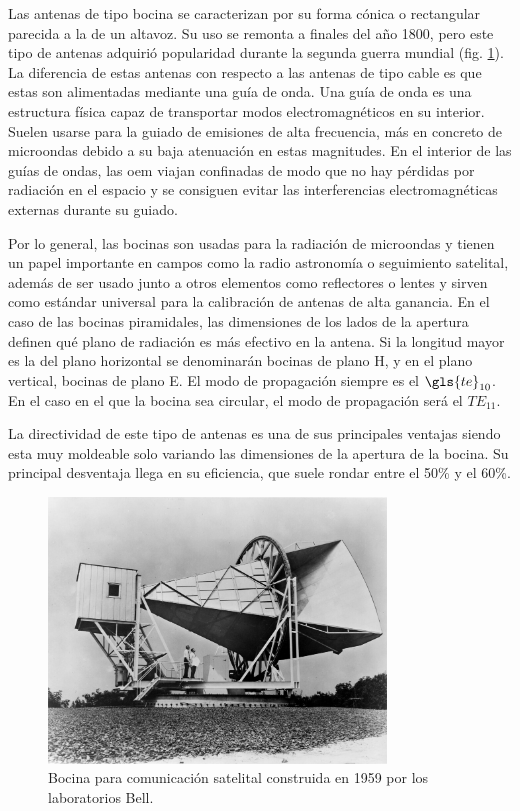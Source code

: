 \par Las antenas de tipo bocina se caracterizan por su forma cónica o rectangular parecida a la de un altavoz. Su uso se remonta a finales del año 1800, pero este tipo de antenas adquirió popularidad durante la segunda guerra mundial (fig. \ref{fig:horn}). La diferencia de estas antenas con respecto a las antenas de tipo cable es que estas son alimentadas mediante una guía de onda. Una guía de onda es una estructura física capaz de transportar modos electromagnéticos en su interior. Suelen usarse para la guiado de emisiones de alta frecuencia, más en concreto de microondas debido a su baja atenuación en estas magnitudes. En el interior de las guías de ondas, las \gls{oem} viajan confinadas de modo que no hay pérdidas por radiación en el espacio y se consiguen evitar las interferencias electromagnéticas externas durante su guiado.
\\
\par Por lo general, las bocinas son usadas para la radiación de microondas y tienen un papel importante en campos como la radio astronomía o seguimiento satelital, además de ser usado junto a otros elementos como reflectores o lentes y sirven como estándar universal para la calibración de antenas de alta ganancia. En el caso de las bocinas piramidales, las dimensiones de los lados de la apertura definen qué plano de radiación es más efectivo en la antena. Si la longitud mayor es la del plano horizontal se denominarán bocinas de plano H, y en el plano vertical, bocinas de plano E. El modo de propagación siempre es el $\gls{te} _{10}$. En el caso en el que la bocina sea circular, el modo de propagación será el $TE_{11}$.
\\
\par La directividad de este tipo de antenas es una de sus principales ventajas siendo esta muy moldeable solo variando las dimensiones de la apertura de la bocina. Su principal desventaja llega en su eficiencia, que suele rondar entre el 50\% y el 60\%.
\begin{figure}[h]
    \centering
        \includegraphics[width=0.8\textwidth]{archivos/horn}
        \caption{Bocina para comunicación satelital construida en 1959 por los laboratorios Bell. \cite{NASA1962}}
        \label{fig:horn}
\end{figure}

